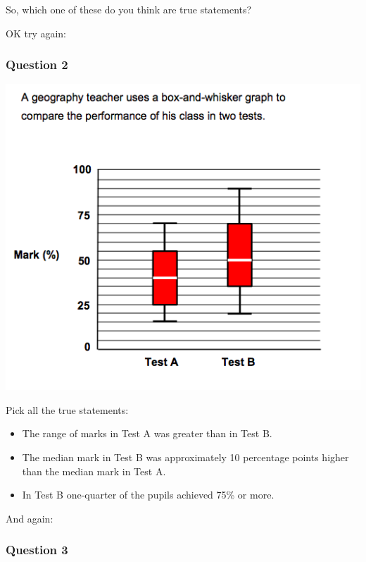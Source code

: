 \documentclass[
]{book}
\providecommand{\tightlist}{%
  \setlength{\itemsep}{0pt}\setlength{\parskip}{0pt}}
\begin{document}
So, which one of these do you think are true statements?

OK try again:

\hypertarget{question-2}{%
\subsubsection*{Question 2}\label{question-2}}

\includegraphics{imgs/numtest_2.png}

Pick all the true statements:

\begin{itemize}
\tightlist
\item
  The range of marks in Test A was greater than in Test B.
\item
  The median mark in Test B was approximately 10 percentage points higher than the median mark in Test A.
\item
  In Test B one-quarter of the pupils achieved 75\% or more.
\end{itemize}

And again:

\hypertarget{question-3}{%
\subsubsection*{Question 3}\label{question-3}}
\end{document}
